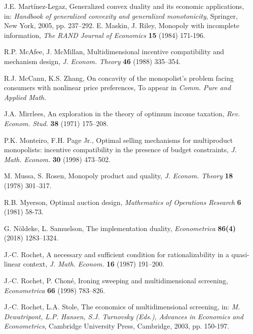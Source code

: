 \documentclass[a4paper, 11pt]{amsart}
\numberwithin{equation}{section}
\theoremstyle{plain}
\theoremstyle{definition}
\theoremstyle{remark}
\begin{document}
\begin{thebibliography}{BCDE}
	
{ 
	J.E. Martínez-Legaz, 
	Generalized convex duality and its economic applications, in: 
	{\em Handbook of generalized convexity and generalized monotonicity}, Springer, New York, 2005, pp. 237--292.	
}
{
	E. Maskin, J. Riley, 
	Monopoly with incomplete information, 
	{\em The RAND Journal of Economics} {\bf 15} (1984) 171-196.
}	
	

	
	R.P. McAfee, J. McMillan, 
	Multidimensional incentive compatibility and mechanism design, 
	{\em J. Econom. Theory} {\bf 46} (1988) 335–354.
		
	R.J. McCann, K.S. Zhang,
	On concavity of the monopolist's problem facing consumers with nonlinear price preferences,
	To appear in {\em Comm. Pure and Applied Math.}
		
	J.A. Mirrlees, 
	An exploration in the theory of optimum income taxation, 
	{\em Rev. Econom. Stud.} {\bf 38} (1971) 175–208.
	

	P.K. Monteiro, F.H. Page Jr., 
	Optimal selling mechanisms for multiproduct monopolists: incentive compatibility in the presence of budget constraints, 
	{\em J. Math. Econom.} {\bf 30} (1998) 473–502.


	M. Mussa, S. Rosen, 
	Monopoly product and quality, 
	{\em J. Econom. Theory} {\bf 18} (1978) 301–317.

{
	R.B. Myerson, 
	Optimal auction design, 
	{\em  Mathematics of Operations Research} {\bf 6} (1981) 58-73.
}

	G. N\"oldeke, L. Samuelson, 
	The implementation duality, 
	{\em Econometrica} {\bf 86(4)} (2018) 1283–1324.


	J.-C. Rochet,
	A necessary and sufficient condition for rationalizability in a quasi-linear context,
	{\em J. Math. Econom.} {\bf 16} (1987) 191--200.


	J.-C. Rochet, P. Chon\'e, 
	Ironing sweeping and multidimensional screening, 
	{\em Econometrica} {\bf 66} (1998) 783–826.
	
	J.-C. Rochet, L.A. Stole, 
	The economics of multidimensional screening, in: 
	{\em M. Dewatripont, L.P. Hansen, S.J. Turnovsky (Eds.),  Advances in Economics and Econometrics}, Cambridge University Press, Cambridge, 2003, pp. 150-197.
	

\end{thebibliography}
\end{document}
